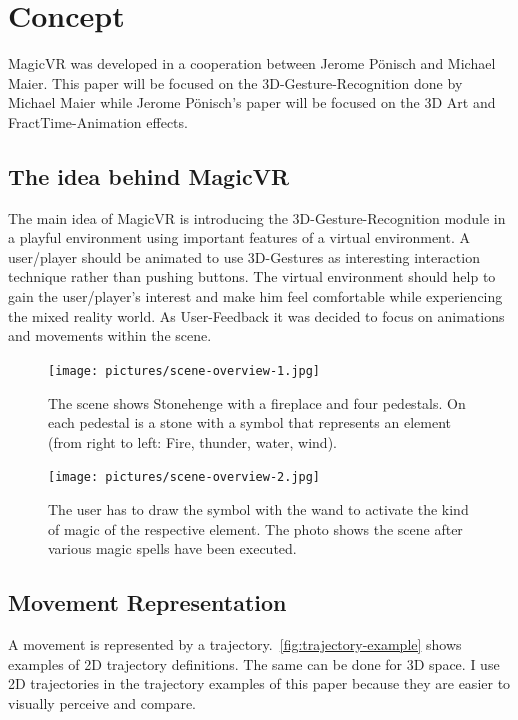 \section{Concept}

MagicVR was developed in a cooperation between Jerome Pönisch and Michael Maier.
This paper will be focused on the 3D-Gesture-Recognition done by Michael Maier while Jerome Pönisch\rq{}s paper will be focused on the 3D Art and FractTime-Animation effects.

\subsection{The idea behind MagicVR}

The main idea of MagicVR is introducing the 3D-Gesture-Recognition module in a playful environment using important features of a virtual environment.
A user/player should be animated to use 3D-Gestures as interesting interaction technique rather than pushing buttons.
The virtual environment should help to gain the user/player\rq{}s interest and make him feel comfortable while experiencing the mixed reality world.
As User-Feedback it was decided to focus on animations and movements within the scene.

\begin{figure}[!ht]
    \centering
    \texttt{[image: pictures/scene-overview-1.jpg]}
    \caption{The scene shows Stonehenge with a fireplace and four pedestals.
    On each pedestal is a stone with a symbol that represents an element (from right to left: Fire, thunder, water, wind).}
    \label{fig:scene-overview-1}
\end{figure}

\begin{figure}[!ht]
    \centering
    \texttt{[image: pictures/scene-overview-2.jpg]}
    \caption{The user has to draw the symbol with the wand to activate the kind of magic of the respective element.
    The photo shows the scene after various magic spells have been executed. }
    \label{fig:scene-overview-2}
\end{figure}


\subsection{Movement Representation}

A movement is represented by a trajectory.~\autoref{fig:trajectory-example} shows examples of 2D trajectory definitions.
The same can be done for 3D space.
I use 2D trajectories in the trajectory examples of this paper because they are easier to visually perceive and compare.

